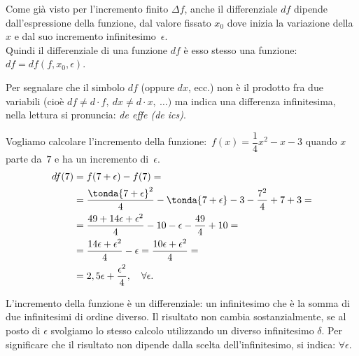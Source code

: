 Come già visto per l'incremento finito $\Delta f$, anche il differenziale $df$ 
dipende dall'espressione della funzione, dal valore fissato \(x_0\) dove inizia 
la variazione della $x$ e dal suo incremento infinitesimo~$\epsilon$.\\
Quindi il differenziale di una funzione \(df\) è esso stesso  una funzione:
\(df=df(f, x_0, \epsilon)\). 

\begin{osservazione}
Per segnalare che il simbolo \(df\) (oppure \(dx\), ecc.) non è il prodotto fra 
due variabili (cioè \(df\ne d \cdot f,\ dx\ne d\cdot x,\ \dots)\) ma indica 
una differenza infinitesima, nella lettura si pronuncia:
\textit{de effe (de ics)}.
\end{osservazione}

\begin{minipage}{.48 \textwidth}
\begin{esempio}
Vogliamo calcolare l'incremento della 
funzione:~\(f(x) = \dfrac{1}{4} x^2 -x -3\)
quando \(x\) parte da~\(7\) e ha un incremento di~\(\epsilon\).
\begin{align*}
  df(7) &= f(7+\epsilon) - f(7) = \\
        &= \dfrac{\tonda{7 +\epsilon}^2}{4}  -\tonda{7 +\epsilon} -3 - 
           \dfrac{7^2}{4}  +7 +3 =\\
        &= \dfrac{49 +14 \epsilon +\epsilon^2}{4} -10 -\epsilon - 
           \dfrac{49}{4} +10 =\\
        &= \dfrac{14 \epsilon +\epsilon^2}{4} -\epsilon 
        = \dfrac{10 \epsilon +\epsilon^2}{4} =\\
        &= 2,5 \epsilon + \dfrac{\epsilon^2}{4}, \quad \forall \epsilon. 
\end{align*}
\end{esempio}
\end{minipage}
 \hfill
\begin{minipage}{.48 \textwidth}
 \begin{center}
\differenziale
 \end{center}
\end{minipage}
L'incremento della funzione è un differenziale: un infinitesimo che è la somma 
di due infinitesimi di ordine diverso. Il risultato non cambia 
sostanzialmente, se al posto di \(\epsilon\) svolgiamo lo stesso calcolo 
utilizzando un diverso infinitesimo \(\delta\). Per significare che il 
risultato non dipende dalla scelta dell'infinitesimo, si indica: \(\forall 
\epsilon\).

